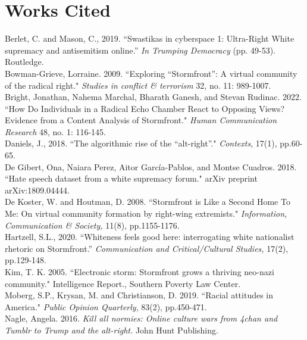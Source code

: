 \documentclass[12pt]{paper}
\begin{document}
\section*{Works Cited}
\singlespace 
\begin{hangparas}{.25in}{1}

Berlet, C. and Mason, C., 2019. ``Swastikas in cyberspace 1: Ultra-Right White supremacy and antisemitism online.” \textit{In Trumping Democracy} (pp. 49-53). Routledge.
\\

Bowman-Grieve, Lorraine. 2009. ``Exploring ``Stormfront”: A virtual community of the radical right." \textit{Studies in conflict \& terrorism} 32, no. 11: 989-1007.
\\


Bright, Jonathan, Nahema Marchal, Bharath Ganesh, and Stevan Rudinac. 2022. ``How Do Individuals in a Radical Echo Chamber React to Opposing Views? Evidence from a Content Analysis of Stormfront." \textit{Human Communication Research} 48, no. 1: 116-145.
\\


Daniels, J., 2018. ``The algorithmic rise of the ``alt-right”." \textit{Contexts}, 17(1), pp.60-65.
\\


De Gibert, Ona, Naiara Perez, Aitor García-Pablos, and Montse Cuadros. 2018. ``Hate speech dataset from a white supremacy forum." arXiv preprint arXiv:1809.04444.
\\


De Koster, W. and Houtman, D. 2008. ``Stormfront is Like a Second Home To Me: On virtual community formation by right-wing extremists." \textit{Information, Communication \& Society,} 11(8), pp.1155-1176.
\\


Hartzell, S.L., 2020. ``Whiteness feels good here: interrogating white nationalist rhetoric on Stormfront.” \textit{Communication and Critical/Cultural Studies,} 17(2), pp.129-148.
\\


Kim, T. K. 2005. ``Electronic storm: Stormfront grows a thriving neo-nazi community." Intelligence Report., Southern Poverty Law Center.
\\


Moberg, S.P., Krysan, M. and Christianson, D. 2019. ``Racial attitudes in America." \textit{Public Opinion Quarterly}, 83(2), pp.450-471.
\\


Nagle, Angela. 2016. \textit{Kill all normies: Online culture wars from 4chan and Tumblr to Trump and the alt-right.} John Hunt Publishing.
\\



\end{hangparas}
\end{document}
